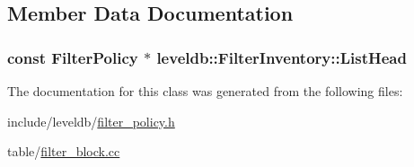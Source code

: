 \subsection{Member Data Documentation}
\hypertarget{classleveldb_1_1_filter_inventory_a85bc22a1823f1c19801bda35e83fcfb1}{}
\subsubsection[{List\+Head}]{\setlength{\rightskip}{0pt plus 5cm}const {\bf Filter\+Policy} $\ast$ leveldb\+::\+Filter\+Inventory\+::\+List\+Head\hspace{0.3cm}{\ttfamily [static]}}\label{classleveldb_1_1_filter_inventory_a85bc22a1823f1c19801bda35e83fcfb1}


The documentation for this class was generated from the following files\+:\begin{DoxyCompactItemize}
\item 
include/leveldb/\hyperlink{filter__policy_8h}{filter\+\_\+policy.\+h}\item 
table/\hyperlink{filter__block_8cc}{filter\+\_\+block.\+cc}\end{DoxyCompactItemize}

